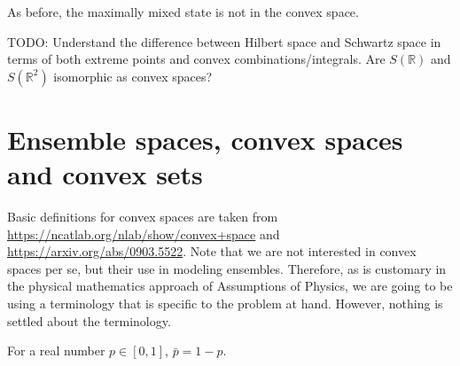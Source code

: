 As before, the maximally mixed state is not in the convex space.

TODO: Understand the difference between Hilbert space and Schwartz space in terms of both extreme points and convex combinations/integrals. Are $S(\mathbb{R})$ and $S(\mathbb{R}^2)$ isomorphic as convex spaces?


\section{Ensemble spaces, convex spaces and convex sets}

Basic definitions for convex spaces are taken from \url{https://ncatlab.org/nlab/show/convex+space} and \url{https://arxiv.org/abs/0903.5522}. Note that we are not interested in convex spaces per se, but their use in modeling ensembles. Therefore, as is customary in the physical mathematics approach of Assumptions of Physics, we are going to be using a terminology that is specific to the problem at hand. However, nothing is settled about the terminology.

\begin{defn}
	For a real number $p \in [0,1]$, $\bar{p} = 1-p$.
\end{defn}

